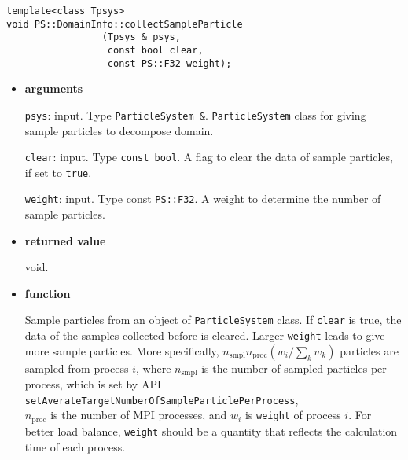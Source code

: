 \begin{screen}
\begin{verbatim}
template<class Tpsys>
void PS::DomainInfo::collectSampleParticle
                 (Tpsys & psys,
                  const bool clear,
                  const PS::F32 weight);
\end{verbatim}
\end{screen}

\begin{itemize}

\item {\bf arguments}

\texttt{psys}: input. Type {\tt ParticleSystem \&}. {\tt ParticleSystem} class
for giving sample particles to decompose domain.

\texttt{clear}: input. Type \texttt{const bool}. A flag to clear the data of sample
particles, if set to \texttt{true}.

\texttt{weight}: input. Type const {\tt PS::F32}. A weight to determine the
number of sample particles.





\item {\bf returned value}

void.

\item {\bf function}

Sample particles from an object of {\tt ParticleSystem} class. If
\texttt{clear} is true, the data of the samples collected before is
cleared. Larger \texttt{weight} leads to give more sample particles.
More specifically, $n_{\mathrm{smpl}}n_{\mathrm{proc}}(w_{i}/\sum_{k}w_{k})$
particles are sampled from process $i$, where $n_{\mathrm{smpl}}$ is the
number of sampled particles per process, which is set by API\\
\texttt{setAverateTargetNumberOfSampleParticlePerProcess},\\
$n_{\mathrm{proc}}$ is the number of MPI processes, and $w_{i}$ is
\texttt{weight} of process $i$. For better load balance, \texttt{weight}
should be a quantity that reflects the calculation time of each process.




\end{itemize}

